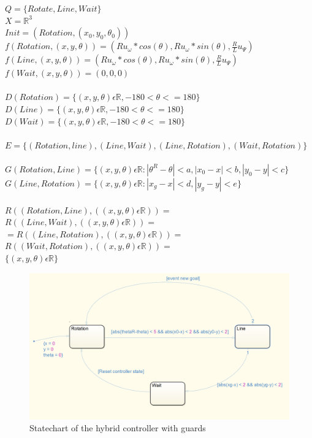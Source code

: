 \documentclass[a4paper,12pt,oneside,onecolumn]{article} %
\begin{document}
	$Q = \{Rotate,Line,Wait\}$\\
	$X = \mathbb{R}^3$\\
	$Init = (Rotation,(x_0,y_0,\theta_0))$
	\\
	$f(Rotation,(x,y,\theta)) = (Ru_\omega*cos(\theta),Ru_\omega*sin(\theta),\frac{R}{L}u_\Psi)$\\
	$f(Line,(x,y,\theta)) = (Ru_\omega*cos(\theta),Ru_\omega*sin(\theta),\frac{R}{L}u_\Psi)$\\
	$f(Wait,(x,y,\theta)) = (0,0,0)$\\
	\\
	$D(Rotation) = \{(x,y,\theta) \epsilon \mathbb{R}, -180 < \theta <= 180\}$\\
	$D(Line) = \{(x,y,\theta) \epsilon \mathbb{R}, -180 < \theta <= 180\}$\\
	$D(Wait) = \{(x,y,\theta) \epsilon \mathbb{R}, -180 < \theta <= 180\}$\\
	\\
	$E = \{ (Rotation,line),(Line,Wait),(Line,Rotation),(Wait,Rotation)\}$\\\\
	$G(Rotation, Line) = \{(x,y,\theta) \epsilon \mathbb{R}: |\theta^R - \theta| < a, |x_0 - x| < b, |y_0 -y| < c\}$\\
	$G(Line, Rotation)=\{(x,y,\theta) \epsilon \mathbb{R}: |x_g - x|<d,|y_g -y|<e\}$\\\\	
	$R((Rotation, Line), ((x,y,\theta) \epsilon \mathbb{R}))=$ 
	$R((Line, Wait), ((x,y,\theta) \epsilon \mathbb{R}))=$\\
	$=R((Line, Rotation), ((x,y,\theta) \epsilon \mathbb{R}))=$
	$R((Wait, Rotation), ((x,y,\theta) \epsilon \mathbb{R}))=$\\$\{(x,y,\theta) \epsilon \mathbb{R}\}$\\
\begin{figure}[H]
\begin{center}	
  \includegraphics[width = 1\textwidth]{statechart.png}
  \caption{Statechart of the hybrid controller with guards}\label{state}
 \end{center}
\end{figure}
\end{document}
